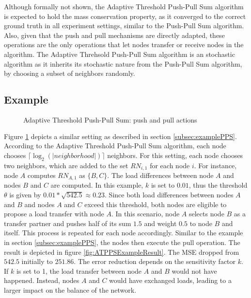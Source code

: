 Although formally not shown, the Adaptive Threshold Push-Pull Sum algorithm is expected to hold the mass conservation property, as it converged to the correct ground truth in all experiment settings, similar to the Push-Pull Sum algorithm. Also, given that the push and pull mechanisms are directly adapted, these operations are the only operations that let nodes transfer or receive nodes in the algorithm. The Adaptive Threhsold Push-Pull Sum algorithm is an stochastic algorithm as it inherits its stochastic nature from the Push-Pull Sum algorithm, by choosing a subset of neighbors randomly.



\subsection{Example}\label{subsec:exampleAdaptiveThresholdPPS}
\begin{figure}
    \centering
    \scalebox{0.75}{}
    \caption{Adaptive Threshold Push-Pull Sum: push and pull actions}
    \label{fig:ATPPSExampleSetting}
\end{figure}

Figure \ref{fig:ATPPSExampleSetting} depicts a similar setting as described in section \ref{subsec:examplePPS}. According to the Adaptive Threshold Push-Pull Sum algorithm, each node chooses $\lceil \log_{2}{(|neighborhood|)} \rceil$ neighbors. For this setting, each node chooses two neighbors, which are added to the set $RN_{i,1}$ for each node $i$. For instance, node $A$ computes $RN_{A,1}$ as $\{B,C\}$. The load differences between node $A$ and nodes $B$ and $C$ are computed. In this example, $k$ is set to $0.01$, thus the threshold $\theta$ is given by $0.01*\sqrt{542.5} \approx 0.23$. Since both load differences between nodes $A$ and $B$ and nodes $A$ and $C$ exceed this threshold, both nodes are eligible to propose a load transfer with node $A$. In this scenario, node $A$ selects node $B$ as a transfer partner and pushes half of its sum $1.5$ and weight $0.5$ to node $B$ and itself. This process is repeated for each node accordingly. Similar to the example in section \ref{subsec:examplePPS}, the nodes then execute the pull operation. The result is depicted in figure \ref{fig:ATPPSExampleResult}. The MSE dropped from $542.5$ initially to $251.86$. The error reduction depends on the sensitivity factor $k$. If $k$ is set to 1, the load transfer between node $A$ and $B$ would not have happened. Instead, nodes $A$ and $C$ would have exchanged loads, leading to a larger impact on the balance of the network. 

